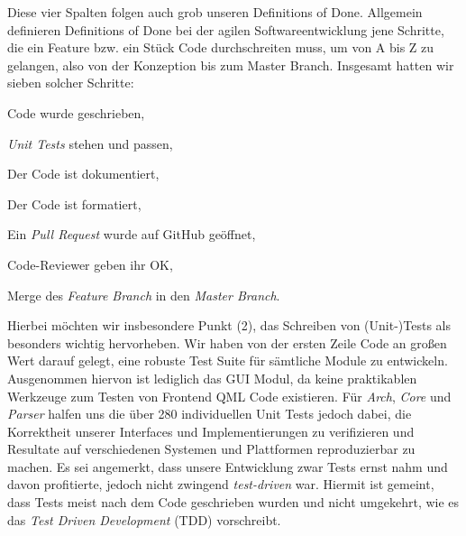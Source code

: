 Diese vier Spalten folgen auch grob unseren Definitions of Done. Allgemein
definieren Definitions of Done bei der agilen Softwareentwicklung jene Schritte,
die ein Feature bzw. ein Stück Code durchschreiten muss, um von A bis Z zu
gelangen, also von der Konzeption bis zum Master Branch. Insgesamt hatten wir
sieben solcher Schritte:
\begin{senumerate}{-0.5cm}
  \item Code wurde geschrieben,
  \item \emph{Unit Tests} stehen und passen,
  \item Der Code ist dokumentiert,
  \item Der Code ist formatiert,
  \item Ein \emph{Pull Request} wurde auf GitHub geöffnet,
  \item Code-Reviewer geben ihr OK,
  \item Merge des \emph{Feature Branch} in den \emph{Master Branch}.
  \vspace{-0.5cm}
\end{senumerate}

Hierbei möchten wir insbesondere Punkt (2), das Schreiben von (Unit-)Tests als
besonders wichtig hervorheben. Wir haben von der ersten Zeile Code an großen
Wert darauf gelegt, eine robuste Test Suite für sämtliche Module zu entwickeln.
Ausgenommen hiervon ist lediglich das GUI Modul, da keine praktikablen Werkzeuge
zum Testen von Frontend QML Code existieren. Für \emph{Arch}, \emph{Core} und
\emph{Parser} halfen uns die über 280 individuellen Unit Tests jedoch dabei, die
Korrektheit unserer Interfaces und Implementierungen zu verifizieren und
Resultate auf verschiedenen Systemen und Plattformen reproduzierbar zu machen.
Es sei angemerkt, dass unsere Entwicklung zwar Tests ernst nahm und davon
profitierte, jedoch nicht zwingend \emph{test-driven} war. Hiermit ist gemeint,
dass Tests meist nach dem Code  geschrieben wurden und nicht umgekehrt, wie es
das \emph{Test Driven Development} (TDD) vorschreibt.
\vspace{-0.7cm}
